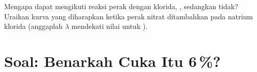 \begin{exercise}[$\star\star\star$]\label{exo:g12:ph-conductivity-titrations:15}
Mengapa  dapat mengikuti reaksi  perak dengan
 klorida, , sedangkan 
tidak? Uraikan kurva yang diharapkan ketika perak nitrat ditambahkan
pada natrium klorida (anggaplah $\lambda$  mendekati nilai
untuk ).
\end{exercise}

\section{Soal: Benarkah Cuka Itu 6\,\%?}

